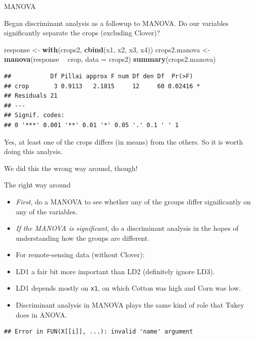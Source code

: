 \documentclass[ignorenonframetext,]{beamer}
\newenvironment{Shaded}{\begin{snugshade}}{\end{snugshade}}
\newcommand{\DataTypeTok}[1]{\textcolor[rgb]{0.13,0.29,0.53}{#1}}
\newcommand{\KeywordTok}[1]{\textcolor[rgb]{0.13,0.29,0.53}{\textbf{#1}}}
\newcommand{\NormalTok}[1]{#1}
\newcommand{\OperatorTok}[1]{\textcolor[rgb]{0.81,0.36,0.00}{\textbf{#1}}}
\newcommand{\StringTok}[1]{\textcolor[rgb]{0.31,0.60,0.02}{#1}}
\begin{document}
\begin{frame}[fragile]{MANOVA}
\protect\hypertarget{manova}{}

Began discriminant analysis as a followup to MANOVA. Do our variables
significantly separate the crops (excluding Clover)?

\begin{Shaded}
\begin{Highlighting}[]
\NormalTok{response <-}\StringTok{ }\KeywordTok{with}\NormalTok{(crops2, }\KeywordTok{cbind}\NormalTok{(x1, x2, x3, x4))}
\NormalTok{crops2.manova <-}\StringTok{ }\KeywordTok{manova}\NormalTok{(response }\OperatorTok{~}\StringTok{ }\NormalTok{crop, }\DataTypeTok{data =}\NormalTok{ crops2)}
\KeywordTok{summary}\NormalTok{(crops2.manova)}
\end{Highlighting}
\end{Shaded}

\begin{verbatim}
##           Df Pillai approx F num Df den Df  Pr(>F)  
## crop       3 0.9113   2.1815     12     60 0.02416 *
## Residuals 21                                        
## ---
## Signif. codes:  
## 0 '***' 0.001 '**' 0.01 '*' 0.05 '.' 0.1 ' ' 1
\end{verbatim}

Yes, at least one of the crops differs (in means) from the others. So it
is worth doing this analysis.

We did this the wrong way around, though!

\end{frame}

\begin{frame}[fragile]{The right way around}
\protect\hypertarget{the-right-way-around}{}

\begin{itemize}
\item
  \emph{First}, do a MANOVA to see whether any of the groups differ
  significantly on any of the variables.
\item
  \emph{If the MANOVA is significant}, do a discriminant analysis in the
  hopes of understanding how the groups are different.
\item
  For remote-sensing data (without Clover):
\item
  LD1 a fair bit more important than LD2 (definitely ignore LD3).
\item
  LD1 depends mostly on \texttt{x1}, on which Cotton was high and Corn
  was low.
\item
  Discriminant analysis in MANOVA plays the same kind of role that Tukey
  does in ANOVA.
\end{itemize}

\begin{verbatim}
## Error in FUN(X[[i]], ...): invalid 'name' argument
\end{verbatim}

\end{frame}
\end{document}
